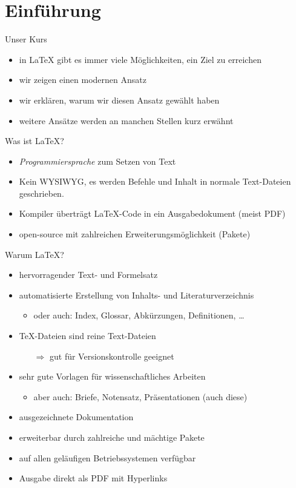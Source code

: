 \section{Einführung}

\begin{frame}{Unser Kurs}
  \begin{itemize}
      \item in \LaTeX{} gibt es immer viele Möglichkeiten, ein Ziel zu erreichen
    \item wir zeigen einen modernen Ansatz 
    \item wir erklären, warum wir diesen Ansatz gewählt haben
    \item weitere Ansätze werden an manchen Stellen kurz erwähnt
  \end{itemize}
\end{frame}

\begin{frame}{Was ist \LaTeX?}
  \begin{itemize}
    \item \emph{Programmiersprache} zum Setzen von Text
    \item Kein WYSIWYG, es werden Befehle und Inhalt in normale Text-Dateien geschrieben.
    \item Kompiler überträgt \LaTeX-Code in ein Ausgabedokument (meist PDF)
    \item open-source mit zahlreichen Erweiterungsmöglichkeit (Pakete)
  \end{itemize}
\end{frame}

\begin{frame}{Warum \LaTeX?}
  \begin{itemize}
    \item hervorragender Text- und Formelsatz
    \item automatisierte Erstellung von Inhalts- und Literaturverzeichnis
      \begin{itemize}
        \item oder auch: Index, Glossar, Abkürzungen, Definitionen, \dots
      \end{itemize}
    \item \TeX-Dateien sind reine Text-Dateien
      \begin{itemize}
        \item[$\Rightarrow$] gut für Versionskontrolle geeignet
      \end{itemize}
    \item sehr gute Vorlagen für wissenschaftliches Arbeiten
      \begin{itemize}
      \item aber auch: Briefe, Notensatz, Präsentationen (auch diese)
      \end{itemize}
    \item ausgezeichnete Dokumentation
    \item erweiterbar durch zahlreiche und mächtige Pakete
    \item auf allen geläufigen Betriebssystemen verfügbar
    \item Ausgabe direkt als PDF mit Hyperlinks
  \end{itemize}
\end{frame}

